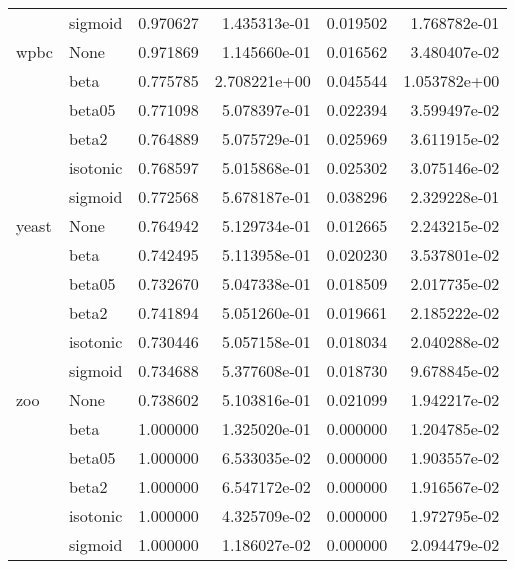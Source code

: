 \begin{tabular}{llrrrr}
        & sigmoid &  0.970627 &  1.435313e-01 &  0.019502 &  1.768782e-01 \\
wpbc & None &  0.971869 &  1.145660e-01 &  0.016562 &  3.480407e-02 \\
        & beta &  0.775785 &  2.708221e+00 &  0.045544 &  1.053782e+00 \\
        & beta05 &  0.771098 &  5.078397e-01 &  0.022394 &  3.599497e-02 \\
        & beta2 &  0.764889 &  5.075729e-01 &  0.025969 &  3.611915e-02 \\
        & isotonic &  0.768597 &  5.015868e-01 &  0.025302 &  3.075146e-02 \\
        & sigmoid &  0.772568 &  5.678187e-01 &  0.038296 &  2.329228e-01 \\
yeast & None &  0.764942 &  5.129734e-01 &  0.012665 &  2.243215e-02 \\
        & beta &  0.742495 &  5.113958e-01 &  0.020230 &  3.537801e-02 \\
        & beta05 &  0.732670 &  5.047338e-01 &  0.018509 &  2.017735e-02 \\
        & beta2 &  0.741894 &  5.051260e-01 &  0.019661 &  2.185222e-02 \\
        & isotonic &  0.730446 &  5.057158e-01 &  0.018034 &  2.040288e-02 \\
        & sigmoid &  0.734688 &  5.377608e-01 &  0.018730 &  9.678845e-02 \\
zoo & None &  0.738602 &  5.103816e-01 &  0.021099 &  1.942217e-02 \\
        & beta &  1.000000 &  1.325020e-01 &  0.000000 &  1.204785e-02 \\
        & beta05 &  1.000000 &  6.533035e-02 &  0.000000 &  1.903557e-02 \\
        & beta2 &  1.000000 &  6.547172e-02 &  0.000000 &  1.916567e-02 \\
        & isotonic &  1.000000 &  4.325709e-02 &  0.000000 &  1.972795e-02 \\
        & sigmoid &  1.000000 &  1.186027e-02 &  0.000000 &  2.094479e-02 \\
\bottomrule
\end{tabular}
